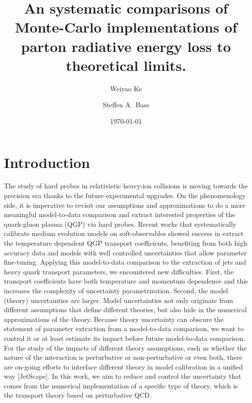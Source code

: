 \documentclass[aps, prc, reprint, amsmath, groupedaddress, nofootinbib]{revtex4-1}
\begin{document}
\title{An systematic comparisons of Monte-Carlo implementations of parton radiative energy loss to theoretical limits.}
\author{Weiyao Ke}
\author{Steffen A.\ Bass}
\date{\today}
\maketitle

\section{Introduction}
The study of hard probes in relativistic heavy-ion collisions is moving towards the precision era thanks to the future experimental upgrades.
On the phenomenology side, it is imperative to revisit our assumptions and approximations to do a more meaningful model-to-data comparison and extract interested properties of the quark-gluon plasma (QGP) via hard probes.
Recent works that systematically calibrate medium evolution models on soft-observables showed success in extract the temperature dependent QGP transport coefficients, benefiting from both high accuracy data and models with well controlled uncertainties that allow parameter fine-tuning.
Applying this model-to-data comparison to the extraction of jets and heavy quark transport parameters, we encountered new difficulties. 
First, the transport coefficients have both temperature and momentum dependence and this increases the complexity of uncertainty parametrization.
Second, the model (theory) uncertainties are larger. 
Model uncertainties not only originate from different assumptions that define different theories, but also hide in the numerical approximations of the theory.
Because theory uncertainty can obscure the statement of parameter extraction from a model-to-data comparison, we want to control it or at least estimate its impact before future model-to-data comparison.
For the study of the impacts of different theory assumptions, such as whether the nature of the interaction is perturbative or non-perturbative or even both, there are on-going efforts to interface different theory in model calibration in a unified way [JetScape].
In this work, we aim to reduce and control the uncertainty that comes from the numerical implementation of a specific type of theory, which is the transport theory based on perturbative QCD.
\end{document}

